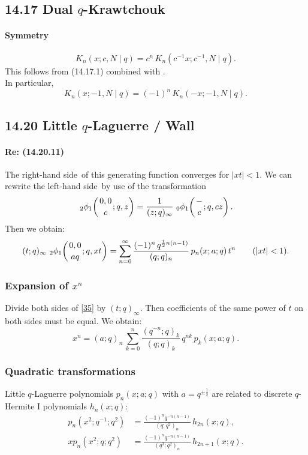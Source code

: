 \documentclass[twoside,11pt]{article}
\newcommand\sa{\smallskipamount}
\newcommand\sLP{\\[\sa]}
\newcommand\half{\frac12}
\newcommand\iy\infty
\newcommand{\qhyp}[5]{\,\mbox{}_{#1}\phi_{#2}\!\left(
  \genfrac{}{}{0pt}{}{#3}{#4};#5\right)}
\newcommand\LHS{left-hand side}
\newcommand\RHS{right-hand side}
\begin{document}
\subsection*{14.17 Dual $q$-Krawtchouk}
%
\paragraph{Symmetry}
\begin{equation}
K_n(x;c,N\mid q)=c^n\,K_n(c^{-1}x;c^{-1},N\mid q).
\label{87}
\end{equation}
This follows from (14.17.1) combined with \cite[(III.11)]{GR}.
\sLP
In particular,
\begin{equation}
K_n(x;-1,N\mid q)=(-1)^n\,K_n(-x;-1,N\mid q).
\label{88}
\end{equation}
%
\subsection*{14.20 Little $q$-Laguerre / Wall}
%
\paragraph{Re: (14.20.11)}
The \RHS\ of this generating function converges for $|xt|<1$.
We can rewrite the \LHS\ by use of the transformation
\begin{equation*}
\qhyp21{0,0}c{q,z}=\frac1{(z;q)_\iy}\,\qhyp01-c{q,cz}.
\end{equation*}
Then we obtain:
\begin{equation}
(t;q)_\iy\,\qhyp21{0,0}{aq}{q,xt}
=\sum_{n=0}^\iy\frac{(-1)^n\,q^{\half n(n-1)}}{(q;q)_n}\,
p_n(x;a;q)\,t^n\qquad(|xt|<1).
\label{35}
\end{equation}
%
\subsubsection*{Expansion of $x^n$}
Divide both sides of \eqref{35} by $(t;q)_\iy$. Then coefficients of the
same power of $t$ on both sides must be equal. We obtain:
\begin{equation}
x^n=(a;q)_n\,\sum_{k=0}^n \frac{(q^{-n};q)_k}{(q;q)_k}\,q^{nk}\,p_k(x;a;q).
\label{36}
\end{equation}
%
\subsubsection*{Quadratic transformations}
Little $q$-Laguerre polynomials $p_n(x;a;q)$ with $a=q^{\pm\half}$ are
related to discrete $q$-Hermite I polynomials $h_n(x;q)$:
\begin{align}
p_n(x^2;q^{-1};q^2)&=
\frac{(-1)^n q^{-n(n-1)}}{(q;q^2)_n}\,h_{2n}(x;q),
\label{28}\\
xp_n(x^2;q;q^2)&=
\frac{(-1)^n q^{-n(n-1)}}{(q^3;q^2)_n}\,h_{2n+1}(x;q).
\label{29}
\end{align}
%
\end{document}
